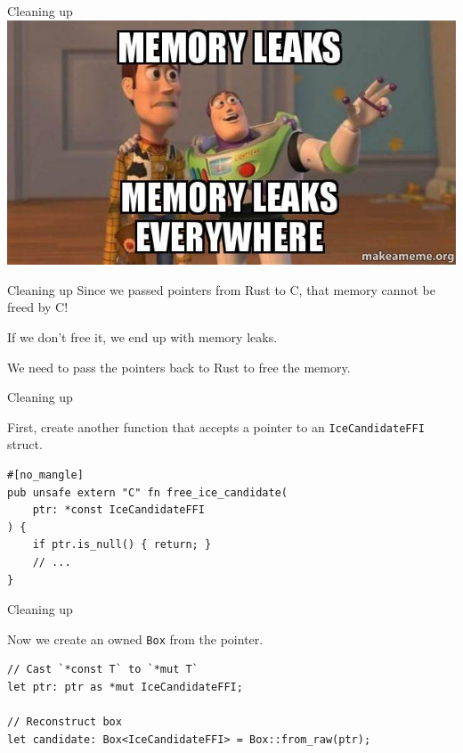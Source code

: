 \documentclass[aspectratio=1610,14pt,t]{beamer}
\begin{document}
\begin{frame}[c]{Cleaning up}
  \centering
  \includegraphics[width=.8\textwidth]{img/memory-leaks.jpg}
\end{frame}

\begin{frame}[c]{Cleaning up}
  Since we passed pointers from Rust to C, that memory cannot be freed by C!

  If we don't free it, we end up with memory leaks.

  We need to pass the pointers back to Rust to free the memory.
\end{frame}

\begin{frame}[c,fragile]{Cleaning up}

  First, create another function that accepts a pointer to an
  \texttt{IceCandidateFFI} struct.

  \begin{verbatim}
#[no_mangle]
pub unsafe extern "C" fn free_ice_candidate(
    ptr: *const IceCandidateFFI
) {
    if ptr.is_null() { return; }
    // ...
}
  \end{verbatim}
\end{frame}

\begin{frame}[c,fragile]{Cleaning up}

  Now we create an owned \texttt{Box} from the pointer.

  \begin{verbatim}
// Cast `*const T` to `*mut T`
let ptr: ptr as *mut IceCandidateFFI;

// Reconstruct box
let candidate: Box<IceCandidateFFI> = Box::from_raw(ptr);
  \end{verbatim}
\end{frame}
\end{document}

